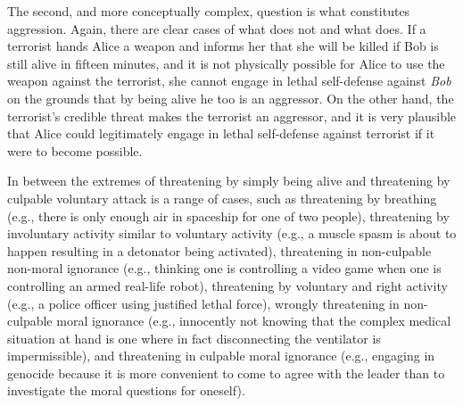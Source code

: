 The second, and more conceptually complex, question is what constitutes aggression. Again, there are clear cases of what does not 
and what does. If a terrorist hands Alice a weapon and informs her that she will be killed if Bob is still alive in fifteen 
minutes, and it is not physically possible for Alice to use the weapon against the terrorist, she cannot engage in lethal 
self-defense against \textit{Bob} on the grounds that by being alive he too is an aggressor. On the other hand, the terrorist's credible threat 
makes the terrorist an aggressor, and it is very plausible that Alice could legitimately engage in lethal self-defense against terrorist if it were 
to become possible.

In between the extremes of threatening by simply being alive and threatening by culpable voluntary attack is a range of cases, 
such as threatening by breathing (e.g., there is only enough air in spaceship for one of two people), threatening
by involuntary activity similar to voluntary activity (e.g., a muscle spasm is about to happen resulting in a detonator 
being activated), threatening in non-culpable non-moral ignorance (e.g., thinking one is controlling a video game when one is controlling an armed real-life robot), threatening by voluntary and right activity (e.g., a police officer using justified lethal force), wrongly threatening in non-culpable moral ignorance (e.g., innocently not knowing that the complex medical situation at hand is one where in fact disconnecting the ventilator is impermissible), and threatening in culpable moral ignorance (e.g., engaging in genocide because
it is more convenient to come to agree with the leader than to investigate the moral questions for oneself). 

